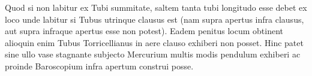               \pstart Quod si non labitur ex Tubi summitate, saltem tanta tubi longitudo esse debet ex loco unde labitur si Tubus utrinque clausus est (nam supra apertus infra clausus, aut supra infraque apertus esse non potest). Eadem penitus locum obtinent alioquin enim Tubus Torricellianus\protect{} in aere clauso exhiberi non posset. Hinc patet sine ullo vase stagnante subjecto Mercurium\protect{} multis modis pendulum\protect{} exhiberi ac proinde Baroscopium\protect{} infra apertum construi posse.
              \pend 
             
